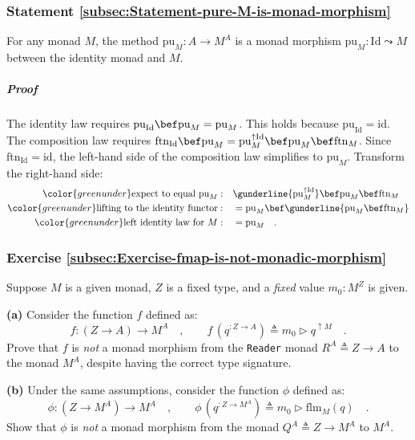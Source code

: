 \subsubsection{Statement \label{subsec:Statement-pure-M-is-monad-morphism}\ref{subsec:Statement-pure-M-is-monad-morphism}}

For any monad $M$, the method $\text{pu}_{M}:A\rightarrow M^{A}$
is a monad morphism $\text{pu}_{M}:\text{Id}\leadsto M$ between the
identity monad and $M$.

\subparagraph{Proof}

The identity law requires $\text{pu}_{\text{Id}}\bef\text{pu}_{M}=\text{pu}_{M}$.
This holds because $\text{pu}_{\text{Id}}=\text{id}$. The composition
law requires $\text{ftn}_{\text{Id}}\bef\text{pu}_{M}=\text{pu}_{M}^{\uparrow\text{Id}}\bef\text{pu}_{M}\bef\text{ftn}_{M}$.
Since $\text{ftn}_{\text{Id}}=\text{id}$, the left-hand side of the
composition law simplifies to $\text{pu}_{M}$. Transform the right-hand
side:
\begin{align*}
{\color{greenunder}\text{expect to equal }\text{pu}_{M}:}\quad & \gunderline{\text{pu}_{M}^{\uparrow\text{Id}}}\bef\text{pu}_{M}\bef\text{ftn}_{M}\\
{\color{greenunder}\text{lifting to the identity functor}:}\quad & =\text{pu}_{M}\bef\gunderline{\text{pu}_{M}\bef\text{ftn}_{M}}\\
{\color{greenunder}\text{left identity law for }M:}\quad & =\text{pu}_{M}\quad.
\end{align*}


\subsubsection{Exercise \label{subsec:Exercise-fmap-is-not-monadic-morphism}\ref{subsec:Exercise-fmap-is-not-monadic-morphism}}

Suppose $M$ is a given monad, $Z$ is a fixed type, and a \emph{fixed}
value $m_{0}:M^{Z}$ is given.

\textbf{(a)} Consider the function $f$ defined as:
\[
f:\left(Z\rightarrow A\right)\rightarrow M^{A}\quad,\quad\quad f\,(q^{:Z\rightarrow A})\triangleq m_{0}\triangleright q^{\uparrow M}\quad.
\]
Prove that $f$ is \emph{not} a monad morphism from the \lstinline!Reader!
monad $R^{A}\triangleq Z\rightarrow A$ to the monad $M^{A}$, despite
having the correct type signature.

\textbf{(b)} Under the same assumptions, consider the function $\phi$
defined as:
\[
\phi:(Z\rightarrow M^{A})\rightarrow M^{A}\quad,\quad\quad\phi\,(q^{:Z\rightarrow M^{A}})\triangleq m_{0}\triangleright\text{flm}_{M}(q)\quad.
\]
Show that $\phi$ is \emph{not} a monad morphism from the monad $Q^{A}\triangleq Z\rightarrow M^{A}$
to $M^{A}$.

